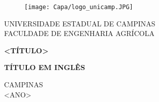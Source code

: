 \thispagestyle{empty} %
%
\begin{figure}[ht]
    \advance\leftskip 0cm
    \texttt{[image: Capa/logo\_unicamp.JPG]}
\end{figure}

\vspace*{-3cm}
\begin{center}
	\large UNIVERSIDADE ESTADUAL DE CAMPINAS\\
		   FACULDADE DE ENGENHARIA AGRÍCOLA
\end{center}

\vspace*{3cm}

\begin{center}
    {\bf <SEU NOME>}    
\end{center}

\vspace*{3.15cm}

\begin{center}
	{\sc \Large  \bf <TÍTULO>}
\end{center}

\vspace*{3.15cm}

\begin{center}
	{\sc \Large  \bf TÍTULO EM INGLÊS}
\end{center}

\vspace*{3.15cm}


\null \vfill

\begin{center}
	CAMPINAS\\<ANO>
\end{center}
\newpage

\thispagestyle{empty} %
\vspace*{0cm}
\begin{center}
	\large <SEU NOME>
\end{center}

